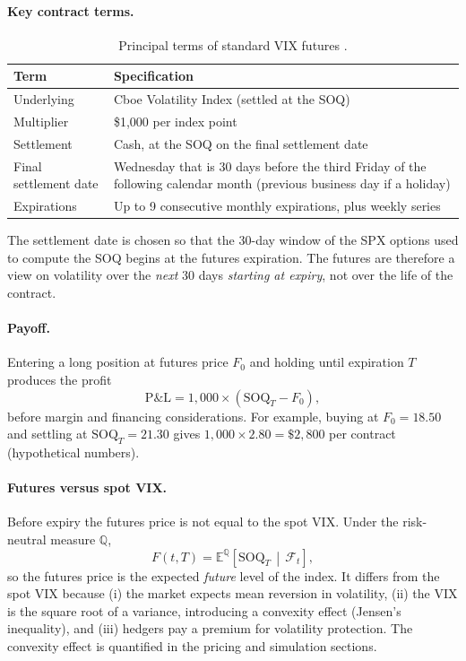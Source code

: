 \paragraph{Key contract terms.}
\begin{table}[htbp]
\centering
\small
\begin{tabular}{@{}p{3.6cm}p{11cm}@{}}
\toprule
\textbf{Term} & \textbf{Specification}\\
\midrule
Underlying & Cboe Volatility Index (settled at the SOQ)\\
Multiplier & \$1{,}000 per index point\\
Settlement & Cash, at the SOQ on the final settlement date\\
Final settlement date & Wednesday that is 30 days before the third Friday of the following calendar month (previous business day if a holiday) \cite{cboevxfut}\\
Expirations & Up to 9 consecutive monthly expirations, plus weekly series \cite{cboevxfut}\\
\bottomrule
\end{tabular}
\caption{Principal terms of standard VIX futures \cite{cboevxfut}.}
\label{tab:vx-spec}
\end{table}

The settlement date is chosen so that the 30-day window of the SPX options used to compute the SOQ begins at the futures expiration. The futures are therefore a view on volatility over the \emph{next} 30 days \emph{starting at expiry}, not over the life of the contract.

\paragraph{Payoff.} Entering a long position at futures price $F_0$ and holding until expiration $T$ produces the profit
\begin{equation}
  \text{P\&L} = 1{,}000\times(\text{SOQ}_T - F_0),
\end{equation}
before margin and financing considerations. For example, buying at $F_0=18.50$ and settling at $\text{SOQ}_T = 21.30$ gives $1{,}000\times 2.80=\$2{,}800$ per contract (hypothetical numbers).

\paragraph{Futures versus spot VIX.} Before expiry the futures price is not equal to the spot VIX. Under the risk-neutral measure $\mathbb{Q}$,
\begin{equation}
  F(t,T) = \mathbb{E}^{\mathbb{Q}}\!\left[\text{SOQ}_T \,\middle|\, \mathcal{F}_t\right],
  \label{eq:fut-expect}
\end{equation}
so the futures price is the expected \emph{future} level of the index. It differs from the spot VIX because (i) the market expects mean reversion in volatility, (ii) the VIX is the square root of a variance, introducing a convexity effect (Jensen's inequality), and (iii) hedgers pay a premium for volatility protection. The convexity effect is quantified in the pricing and simulation sections.

